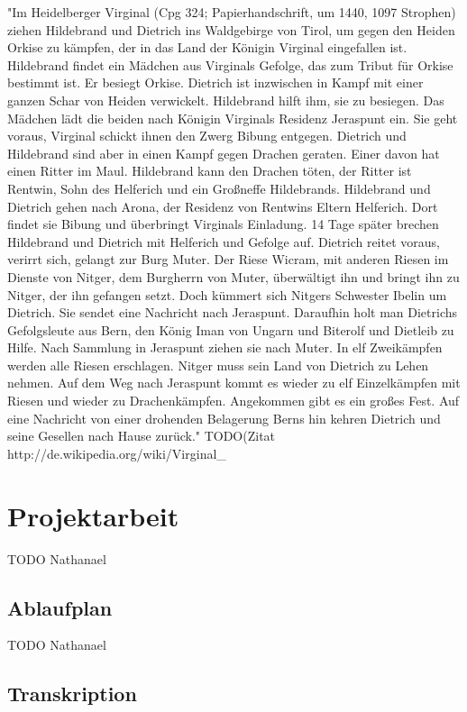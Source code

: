 \documentclass[a4paper, 12pt, oneside]{scrbook}
\begin{document}
"Im Heidelberger Virginal (Cpg 324; Papierhandschrift, um 1440, 1097 Strophen) ziehen Hildebrand und Dietrich ins Waldgebirge von Tirol, um gegen den Heiden Orkise zu kämpfen, der in das Land der Königin Virginal eingefallen ist. Hildebrand findet ein Mädchen aus Virginals Gefolge, das zum Tribut für Orkise bestimmt ist. Er besiegt Orkise. Dietrich ist inzwischen in Kampf mit einer ganzen Schar von Heiden verwickelt. Hildebrand hilft ihm, sie zu besiegen. Das Mädchen lädt die beiden nach Königin Virginals Residenz Jeraspunt ein. Sie geht voraus, Virginal schickt ihnen den Zwerg Bibung entgegen. Dietrich und Hildebrand sind aber in einen Kampf gegen Drachen geraten. Einer davon hat einen Ritter im Maul. Hildebrand kann den Drachen töten, der Ritter ist Rentwin, Sohn des Helferich und ein Großneffe Hildebrands. Hildebrand und Dietrich gehen nach Arona, der Residenz von Rentwins Eltern Helferich. Dort findet sie Bibung und überbringt Virginals Einladung. 14 Tage später brechen Hildebrand und Dietrich mit Helferich und Gefolge auf. Dietrich reitet voraus, verirrt sich, gelangt zur Burg Muter. Der Riese Wicram, mit anderen Riesen im Dienste von Nitger, dem Burgherrn von Muter, überwältigt ihn und bringt ihn zu Nitger, der ihn gefangen setzt. Doch kümmert sich Nitgers Schwester Ibelin um Dietrich. Sie sendet eine Nachricht nach Jeraspunt. Daraufhin holt man Dietrichs Gefolgsleute aus Bern, den König Iman von Ungarn und Biterolf und Dietleib zu Hilfe. Nach Sammlung in Jeraspunt ziehen sie nach Muter. In elf Zweikämpfen werden alle Riesen erschlagen. Nitger muss sein Land von Dietrich zu Lehen nehmen. Auf dem Weg nach Jeraspunt kommt es wieder zu elf Einzelkämpfen mit Riesen und wieder zu Drachenkämpfen. Angekommen gibt es ein großes Fest. Auf eine Nachricht von einer drohenden Belagerung Berns hin kehren Dietrich und seine Gesellen nach Hause zurück." TODO(Zitat http://de.wikipedia.org/wiki/Virginal_%

\chapter{Projektarbeit}
TODO Nathanael
\section{Ablaufplan}
TODO Nathanael

\section{Transkription}
\end{document}
